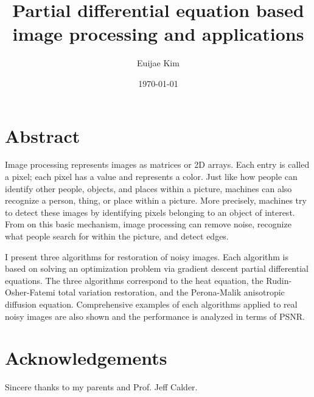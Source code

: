 \documentclass[12pt]{report}
\title{Partial differential equation based image processing and applications}
\author{Euijae Kim}
\date{\today}
\begin{document}
	\maketitle
    \section*{Abstract}
Image processing represents images as matrices or 2D arrays. Each entry is called a pixel; each pixel has a value and represents a color. Just like how people can identify other people, objects, and places within a picture, machines can also recognize a person, thing, or place within a picture. More precisely, machines try to detect these images by identifying pixels belonging to an object of interest. From on this basic mechanism, image processing can remove noise, recognize what people search for within the picture, and detect edges. \newline

I present three algorithms for restoration of noisy images. Each algorithm is based on solving an optimization problem via gradient descent partial differential equations. The three algorithms correspond to the heat equation, the Rudin-Osher-Fatemi total variation restoration, and the Perona-Malik anisotropic diffusion equation. Comprehensive examples of each algorithms applied to real noisy images are also shown and the performance is analyzed in terms of PSNR.
    \section*{Acknowledgements}
Sincere thanks to my parents and Prof. Jeff Calder.
\end{document}
